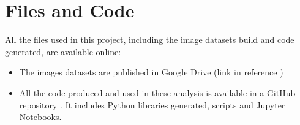 
\chapter{Files and Code}

\label{FilesCode}

All the files used in this project, including the image datasets build and code generated, are available online:

\begin{itemize}

	\item The images datasets are published in Google Drive (link in reference \parencite{datasets})
	
	\item All the code produced and used in these analysis is available in a GitHub repository \parencite{repository}. It includes Python libraries generated, scripts and Jupyter Notebooks.

\end{itemize}

